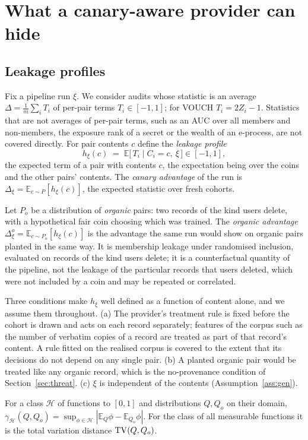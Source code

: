 \section{What a canary-aware provider can hide}\label{sec:bound}

\subsection{Leakage profiles}

Fix a pipeline run $\xi$. We consider audits whose statistic is an average
$\Delta=\frac1m\sum_iT_i$ of per-pair terms $T_i\in[-1,1]$; for VOUCH $T_i=2Z_i-1$. Statistics
that are not averages of per-pair terms, such as an AUC over all members and non-members, the
exposure rank of a secret or the wealth of an e-process, are not covered directly. For pair
contents $c$ define the \emph{leakage profile}
\[
h_\xi(c)\;=\;\mathbb{E}\bigl[\,T_i\;\big|\;C_i=c,\ \xi\,\bigr]\in[-1,1],
\]
the expected term of a pair with contents $c$, the expectation being over the coins and the
other pairs' contents. The \emph{canary advantage} of the run is
$\Delta_\xi=\mathbb{E}_{c\sim P}[h_\xi(c)]$, the expected statistic over fresh cohorts.

Let $P_o$ be a distribution of \emph{organic} pairs: two records of the kind users delete,
with a hypothetical fair coin choosing which was trained. The \emph{organic advantage}
$\Delta^o_\xi=\mathbb{E}_{c\sim P_o}[h_\xi(c)]$ is the advantage the same run would show on
organic pairs planted in the same way. It is membership leakage under randomised inclusion,
evaluated on records of the kind users delete; it is a counterfactual quantity of the
pipeline, not the leakage of the particular records that users deleted, which were not
included by a coin and may be repeated or correlated.

Three conditions make $h_\xi$ well defined as a function of content alone, and we assume them
throughout. (a) The provider's treatment rule is fixed before the cohort is drawn and acts on
each record separately; features of the corpus such as the number of verbatim copies of a
record are treated as part of that record's content. A rule fitted on the realised corpus is
covered to the extent that its decisions do not depend on any single pair. (b) A planted
organic pair would be treated like any organic record, which is the no-provenance condition
of Section~\ref{sec:threat}. (c) $\xi$ is independent of the contents
(Assumption~\ref{ass:gen}).

\begin{definition}\label{def:gamma}
For a class $\mathcal H$ of functions to $[0,1]$ and distributions $Q,Q_o$ on their domain,
$\gamma_{\mathcal H}(Q,Q_o)=\sup_{\phi\in\mathcal H}|\mathbb{E}_Q\phi-\mathbb{E}_{Q_o}\phi|$.
For the class of all measurable functions it is the total variation distance $\mathrm{TV}(Q,Q_o)$.
\end{definition}


